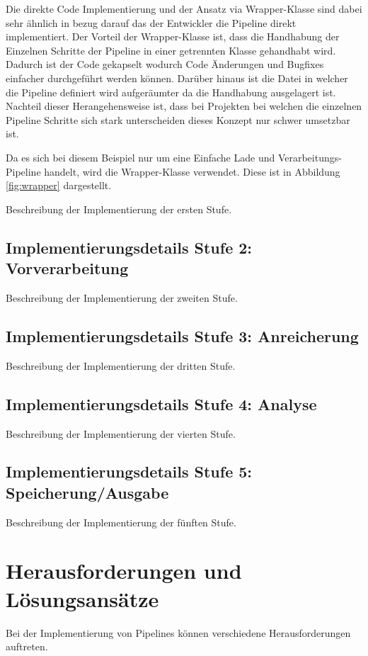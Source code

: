 \documentclass[a4paper]{article} %
\begin{document}
Die direkte Code Implementierung und der Ansatz via Wrapper-Klasse sind dabei sehr ähnlich in bezug darauf das der Entwickler die Pipeline direkt implementiert. Der Vorteil der Wrapper-Klasse ist, dass die Handhabung der Einzelnen Schritte der Pipeline in einer getrennten Klasse gehandhabt wird. Dadurch ist der Code gekapselt wodurch Code Änderungen und Bugfixes einfacher durchgeführt werden können. Darüber hinaus ist die Datei in welcher die Pipeline definiert wird aufgeräumter da die Handhabung ausgelagert ist. Nachteil dieser Herangehensweise ist, dass bei Projekten bei welchen die einzelnen Pipeline Schritte sich stark unterscheiden dieses Konzept nur schwer umsetzbar ist.

Da es sich bei diesem Beispiel nur um eine Einfache Lade und Verarbeitungs-Pipeline handelt, wird die Wrapper-Klasse verwendet. Diese ist in Abbildung \ref{fig:wrapper} dargestellt.

Beschreibung der Implementierung der ersten Stufe.
\blindtext[2]
\lipsum[11]

\subsection{Implementierungsdetails Stufe 2: Vorverarbeitung}
Beschreibung der Implementierung der zweiten Stufe.
\blindtext[2]
\lipsum[12]

\subsection{Implementierungsdetails Stufe 3: Anreicherung}
Beschreibung der Implementierung der dritten Stufe.
\blindtext[2]
\lipsum[13-14]

\subsection{Implementierungsdetails Stufe 4: Analyse}
Beschreibung der Implementierung der vierten Stufe.
\blindtext[2]
\lipsum[15-16]

\subsection{Implementierungsdetails Stufe 5: Speicherung/Ausgabe}
Beschreibung der Implementierung der fünften Stufe.
\blindtext[2]
\lipsum[17-18]


\section{Herausforderungen und Lösungsansätze}
Bei der Implementierung von Pipelines können verschiedene Herausforderungen auftreten.
\end{document}
